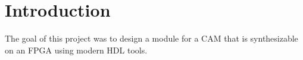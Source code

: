 \section{Introduction}
The goal of this project was to design a module for a CAM that is synthesizable on an FPGA using modern HDL tools. 
